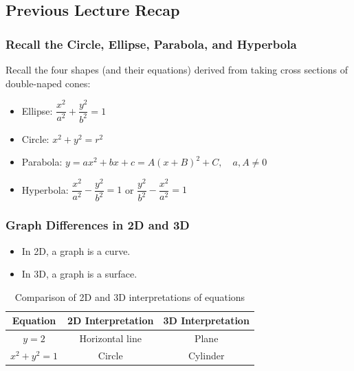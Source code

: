 \documentclass{article}
\begin{document}
\subsection*{Previous Lecture Recap}

\subsubsection*{Recall the Circle, Ellipse, Parabola, and Hyperbola}

Recall the four shapes (and their equations) derived from taking cross sections of double-naped cones:
\begin{itemize}
    \item Ellipse: \(\dfrac{x^2}{a^2} + \dfrac{y^2}{b^2} = 1\)
    \item Circle: \(x^2 + y^2 = r^2\)
    \item Parabola: \( y = ax^2 + bx + c = A(x + B)^2 + C, \quad a, A \neq 0 \)
    \item Hyperbola: \(\dfrac{x^2}{a^2} - \dfrac{y^2}{b^2} = 1\) or \(\dfrac{y^2}{b^2} - \dfrac{x^2}{a^2} = 1\)
\end{itemize}
\subsubsection*{Graph Differences in 2D and 3D}

\begin{itemize}
    \item In 2D, a graph is a curve.
    \item In 3D, a graph is a surface.
\end{itemize}
\begin{conceptbox}
    \begin{table}[H]
        \centering
        \renewcommand{\arraystretch}{1.5}
        \begin{tabular}{|c|c|c|}
            \hline
            \textbf{Equation} & \textbf{2D Interpretation} & \textbf{3D Interpretation} \\ \hline
            \( y = 2 \) & Horizontal line & Plane \\ \hline
            \( x^2 + y^2 = 1 \) & Circle & Cylinder \\ \hline
        \end{tabular}
        \caption{Comparison of 2D and 3D interpretations of equations}
    \end{table}    
\end{conceptbox}
\end{document}
